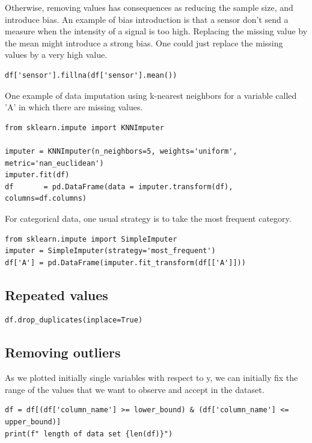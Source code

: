 \documentclass[24pt]{article}
\begin{document}
Otherwise, removing values  has consequences as reducing the sample size, and introduce bias. An example of bias introduction is that a sensor don't send a measure when the intensity of a signal is too high. Replacing the missing value by the mean might introduce a strong bias. One could just replace the missing values by a very high value.

\begin{lstlisting}
df['sensor'].fillna(df['sensor'].mean())
\end{lstlisting}



One example of data imputation using k-nearest neighbors for a variable called 'A' in which there are missing values.

\begin{lstlisting}
from sklearn.impute import KNNImputer

imputer = KNNImputer(n_neighbors=5, weights='uniform', metric='nan_euclidean')
imputer.fit(df)
df       = pd.DataFrame(data = imputer.transform(df), columns=df.columns)
\end{lstlisting}


For categorical data, one usual strategy is to take the most frequent category. 
\begin{lstlisting}
from sklearn.impute import SimpleImputer
imputer = SimpleImputer(strategy='most_frequent')
df['A'] = pd.DataFrame(imputer.fit_transform(df[['A']]))
\end{lstlisting}


\subsection{Repeated  values}
\begin{lstlisting}
df.drop_duplicates(inplace=True)
\end{lstlisting}


\subsection{Removing outliers}

As we plotted initially single variables with respect to y, we can initially fix the range of the values that we want to observe and accept in the dataset.

\begin{lstlisting}
df = df[(df['column_name'] >= lower_bound) & (df['column_name'] <= upper_bound)]  
print(f" length of data set {len(df)}")
\end{lstlisting}
\end{document}
